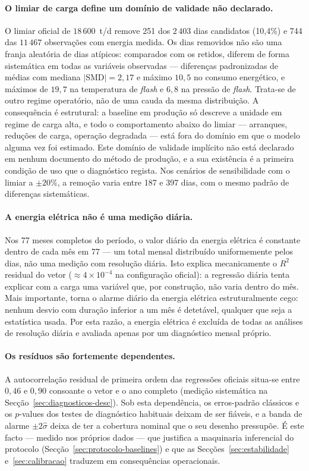 \paragraph{O limiar de carga define um domínio de validade não declarado.}
O limiar oficial de $18\,600$~t/d remove 251 dos $2\,403$ dias candidatos
(10{,}4\%) e 744 das $11\,467$ observações com energia medida. Os dias
removidos não são uma franja aleatória de dias atípicos: comparados com os
retidos, diferem de forma sistemática em todas as variáveis observadas ---
diferenças padronizadas de médias com mediana $|\mathrm{SMD}|=2{,}17$ e máximo
$10{,}5$ no consumo energético, e máximos de $19{,}7$ na temperatura de
\emph{flash} e $6{,}8$ na pressão de \emph{flash}. Trata-se de outro regime
operatório, não de uma cauda da mesma distribuição. A consequência é
estrutural: a baseline em produção só descreve a unidade em regime de carga
alta, e todo o comportamento abaixo do limiar --- arranques, reduções de
carga, operação degradada --- está fora do domínio em que o modelo alguma vez
foi estimado. Este domínio de validade implícito não está declarado em nenhum
documento do método de produção, e a sua existência é a primeira condição de
uso que o diagnóstico regista. Nos cenários de sensibilidade com o limiar a
$\pm 20\%$, a remoção varia entre 187 e 397 dias, com o mesmo padrão de
diferenças sistemáticas.

\paragraph{A energia elétrica não é uma medição diária.} Nos 77 meses
completos do período, o valor diário da energia elétrica é constante dentro de
cada mês em 77 --- um total mensal distribuído uniformemente pelos dias, não
uma medição com resolução diária. Isto explica mecanicamente o $R^2$
residual do vetor ($\approx 4\times 10^{-4}$ na configuração oficial): a
regressão diária tenta explicar com a carga uma variável que, por construção,
não varia dentro do mês. Mais importante, torna o alarme diário da energia
elétrica estruturalmente cego: nenhum desvio com duração inferior a um mês é
detetável, qualquer que seja a estatística usada. Por esta razão, a energia
elétrica é excluída de todas as análises de resolução diária e avaliada
apenas por um diagnóstico mensal próprio.

\paragraph{Os resíduos são fortemente dependentes.} A autocorrelação residual
de primeira ordem das regressões oficiais situa-se entre $0{,}46$ e $0{,}90$
consoante o vetor e o ano completo (medição sistemática na
Secção~\ref{sec:diagnosticos-desc}). Sob esta dependência, os erros-padrão clássicos e
os $p$-values dos testes de diagnóstico habituais deixam de ser fiáveis, e a
banda de alarme $\pm 2\hat\sigma$ deixa de ter a cobertura nominal que o seu
desenho pressupõe. É este facto --- medido nos próprios dados --- que
justifica a maquinaria inferencial do protocolo
(Secção~\ref{sec:protocolo-baselines}) e que as Secções~\ref{sec:estabilidade}
e~\ref{sec:calibracao} traduzem em consequências operacionais.

